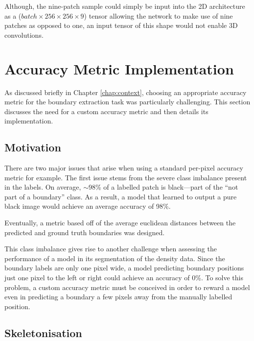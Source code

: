 Although, the nine-patch sample could simply be input into the 2D architecture as a ($batch \times 256 \times 256 \times 9$) tensor allowing the network to make use of nine patches as opposed to one, an input tensor of this shape would not enable 3D convolutions. 

\newpage

\section{Accuracy Metric Implementation}

As discussed briefly in Chapter \ref{chap:context}, choosing an appropriate accuracy metric for the boundary extraction task was particularly challenging. This section discusses the need for a custom accuracy metric and then details its implementation.

\subsection{Motivation}

There are two major issues that arise when using a standard per-pixel accuracy metric for example. The first issue stems from the severe class imbalance present in the labels. On average, ${\sim}$98\% of a labelled patch is black---part of the ``not part of a boundary'' class. As a result, a model that learned to output a pure black image would achieve an average accuracy of 98\%.

Eventually, a metric based off of the average euclidean distances between the predicted and ground truth boundaries was designed.

This class imbalance gives rise to another challenge when assessing the performance of a model in its segmentation of the density data. Since the boundary labels are only one pixel wide, a model predicting boundary positions just one pixel to the left or right could achieve an accuracy of 0\%. To solve this problem, a custom accuracy metric must be conceived in order to reward a model even in predicting a boundary a few pixels away from the manually labelled position.

\subsection{Skeletonisation}

